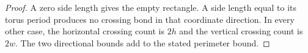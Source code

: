 \begin{proof}\leanok
    A zero side length gives the empty rectangle. A side length equal
    to its torus period produces no crossing bond in that coordinate
    direction. In every other case, the horizontal crossing count is
    $2h$ and the vertical crossing count is $2w$. The two directional
    bounds add to the stated perimeter bound.
\end{proof}
